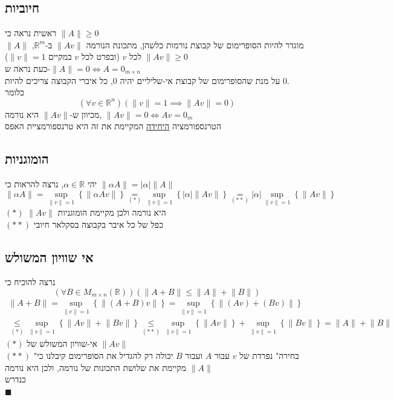 \documentclass[12pt, titlepage]{article}
\begin{document}
\subsection*{חיוביות}
ראשית נראה כי $\lVert A\rVert \geq 0$\\
$\lVert A\rVert$ מוגדר להיות הסופרימום של קבוצת נורמות כלשהן, מתכונת הנורמה $\lVert Av\rVert$ ב-$\mathbb{R}^m$, $\lVert Av\rVert\geq 0$ לכל $v$ (ובפרט לכל $v$ במקיים $\rVert v\rVert=1$)\\
כעת נראה ש-$\lVert A\rVert=0 \iff A=0_{m\times n}$\\
על מנת שהסופרימום של קבוצת אי-שליליים יהיה $0$, כל איברי הקבוצה צריכים להיות $0$.\\
כלומר
\[
  \left(\forall v\in\mathbb{R}^n\right)\left(\lVert v\rVert=1\implies \lVert Av\rVert = 0\right)
\]
מכיוון ש-$\lVert Av\rVert$ היא נורמה, $\lVert Av\rVert = 0 \iff Av = 0_{m}$\\
הטרנספורמציה \underline{היחידה} המקיימת את זה היא טרנספורמציית האפס
\subsection*{הומוגניות}
יהי $\alpha \in \mathbb{R}$, נרצה להראות כי $\lVert \alpha A\rVert=\left|\alpha\right|\lVert A\rVert$
\[
  \lVert \alpha A\rVert = \sup_{\lVert v\rVert=1}\left\{\lVert \alpha A v\rVert\right\} \underset{\left(*\right)}{=} \sup_{\lVert v\rVert =1} \left\{\left|\alpha\right|\lVert Av\rVert\right\} \underset{\left(**\right)}{=} \left|\alpha\right|\sup_{\lVert v\rVert =1} \left\{\lVert Av\rVert\right\} 
\]
$\left(*\right)$ $\lVert Av\rVert$ היא נורמה ולכן מקיימת הומוגניות\\
$\left(**\right)$ כפל של כל איבר בקבוצה בסקלאר חיובי
\subsection*{אי שוויון המשולש}
נרצה להוכיח כי
\[
  \left(\forall B\in M_{m \times n}\left(\mathbb{R}\right)\right)\left(\lVert A + B\rVert\leq\lVert A\rVert + \lVert B \rVert\right)
\]
\begin{gather*}
  \lVert A+B\rVert = \sup_{\lVert v\rVert = 1} \left\{\lVert \left(A+B\right) v\rVert\right\} = \sup_{\lVert v\rVert = 1} \left\{\lVert \left(Av\right) +\left(Bv\right)\rVert\right\} \\
  \underset{\left(*\right)}{\leq} \sup_{\lVert v\rVert = 1} \left\{\lVert A v\rVert +\lVert B v\rVert\right\}  \underset{\left(**\right)}{\leq} \sup_{\lVert v\rVert = 1}\left\{\lVert Av\rVert\right\} + \sup_{\lVert v\rVert = 1}\left\{\lVert Bv\rVert\right\} = \lVert A\rVert + \lVert B\rVert
\end{gather*}
$\left(*\right)$ אי-שוויון המשולש של $\lVert Av\rVert$\\
$\left(**\right)$ "בחירה" נפרדת של $v$ עבור $A$ ועבור $B$ יכולה רק להגדיל את הסופרימום
קיבלנו כי $\lVert A \rVert$ מקיימת את שלושת התכונות של נורמה, ולכן היא נורמה\\
כנדרש\\
$\blacksquare$
\end{document}
